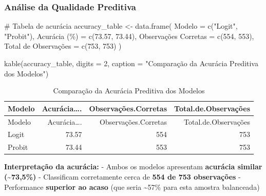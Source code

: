 \documentclass[
  letterpaper,
  DIV=11,
  numbers=noendperiod]{scrartcl}
\newenvironment{Shaded}{\begin{snugshade}}{\end{snugshade}}
\newcommand{\AttributeTok}[1]{\textcolor[rgb]{0.40,0.45,0.13}{#1}}
\newcommand{\CommentTok}[1]{\textcolor[rgb]{0.37,0.37,0.37}{#1}}
\newcommand{\DecValTok}[1]{\textcolor[rgb]{0.68,0.00,0.00}{#1}}
\newcommand{\FloatTok}[1]{\textcolor[rgb]{0.68,0.00,0.00}{#1}}
\newcommand{\FunctionTok}[1]{\textcolor[rgb]{0.28,0.35,0.67}{#1}}
\newcommand{\NormalTok}[1]{\textcolor[rgb]{0.00,0.23,0.31}{#1}}
\newcommand{\OtherTok}[1]{\textcolor[rgb]{0.00,0.23,0.31}{#1}}
\newcommand{\StringTok}[1]{\textcolor[rgb]{0.13,0.47,0.30}{#1}}
\begin{document}
\subsubsection{Análise da Qualidade
Preditiva}\label{anuxe1lise-da-qualidade-preditiva}

\begin{Shaded}
\begin{Highlighting}[]
\CommentTok{\# Tabela de acurácia}
\NormalTok{accuracy\_table }\OtherTok{\textless{}{-}} \FunctionTok{data.frame}\NormalTok{(}
  \AttributeTok{Modelo =} \FunctionTok{c}\NormalTok{(}\StringTok{"Logit"}\NormalTok{, }\StringTok{"Probit"}\NormalTok{),}
  \StringTok{\textasciigrave{}}\AttributeTok{Acurácia (\%)}\StringTok{\textasciigrave{}} \OtherTok{=} \FunctionTok{c}\NormalTok{(}\FloatTok{73.57}\NormalTok{, }\FloatTok{73.44}\NormalTok{),}
  \StringTok{\textasciigrave{}}\AttributeTok{Observações Corretas}\StringTok{\textasciigrave{}} \OtherTok{=} \FunctionTok{c}\NormalTok{(}\DecValTok{554}\NormalTok{, }\DecValTok{553}\NormalTok{),}
  \StringTok{\textasciigrave{}}\AttributeTok{Total de Observações}\StringTok{\textasciigrave{}} \OtherTok{=} \FunctionTok{c}\NormalTok{(}\DecValTok{753}\NormalTok{, }\DecValTok{753}\NormalTok{)}
\NormalTok{)}

\FunctionTok{kable}\NormalTok{(accuracy\_table, }\AttributeTok{digits =} \DecValTok{2}\NormalTok{, }\AttributeTok{caption =} \StringTok{"Comparação da Acurácia Preditiva dos Modelos"}\NormalTok{)}
\end{Highlighting}
\end{Shaded}

\begin{longtable}[]{@{}lrrr@{}}
\caption{Comparação da Acurácia Preditiva dos Modelos}\tabularnewline
\toprule\noalign{}
Modelo & Acurácia\ldots. & Observações.Corretas &
Total.de.Observações \\
\midrule\noalign{}
\endfirsthead
\toprule\noalign{}
Modelo & Acurácia\ldots. & Observações.Corretas &
Total.de.Observações \\
\midrule\noalign{}
\endhead
\bottomrule\noalign{}
\endlastfoot
Logit & 73.57 & 554 & 753 \\
Probit & 73.44 & 553 & 753 \\
\end{longtable}

\textbf{Interpretação da acurácia:} - Ambos os modelos apresentam
\textbf{acurácia similar (\textasciitilde73,5\%)} - Classificam
corretamente cerca de \textbf{554 de 753 observações} - Performance
\textbf{superior ao acaso} (que seria \textasciitilde57\% para esta
amostra balanceada)
\end{document}
